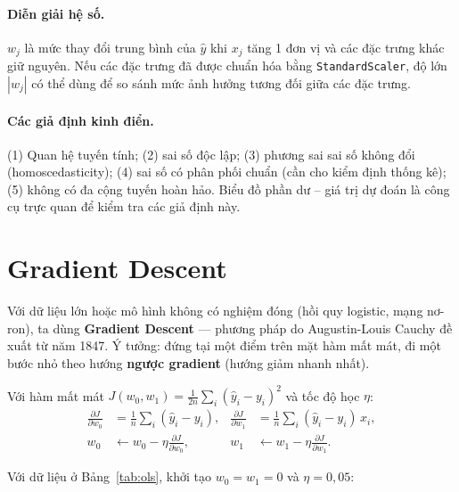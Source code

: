 \paragraph{Diễn giải hệ số.} $w_j$ là mức thay đổi trung bình của $\hat{y}$ khi $x_j$ tăng 1 đơn vị và các đặc trưng khác giữ nguyên. Nếu các đặc trưng đã được chuẩn hóa bằng \texttt{StandardScaler}, độ lớn $|w_j|$ có thể dùng để so sánh mức ảnh hưởng tương đối giữa các đặc trưng.

\paragraph{Các giả định kinh điển.} (1) Quan hệ tuyến tính; (2) sai số độc lập; (3) phương sai sai số không đổi (homoscedasticity); (4) sai số có phân phối chuẩn (cần cho kiểm định thống kê); (5) không có đa cộng tuyến hoàn hảo. Biểu đồ phần dư -- giá trị dự đoán là công cụ trực quan để kiểm tra các giả định này.

\section{Gradient Descent}

Với dữ liệu lớn hoặc mô hình không có nghiệm đóng (hồi quy logistic, mạng nơ-ron), ta dùng \textbf{Gradient Descent} --- phương pháp do Augustin-Louis Cauchy đề xuất từ năm 1847. Ý tưởng: đứng tại một điểm trên mặt hàm mất mát, đi một bước nhỏ theo hướng \textbf{ngược gradient} (hướng giảm nhanh nhất).

Với hàm mất mát $J(w_0, w_1) = \frac{1}{2n}\sum_i (\hat{y}_i - y_i)^2$ và tốc độ học $\eta$:
\begin{align}
    \frac{\partial J}{\partial w_0} &= \frac{1}{n}\sum_i (\hat{y}_i - y_i), &
    \frac{\partial J}{\partial w_1} &= \frac{1}{n}\sum_i (\hat{y}_i - y_i)\, x_i, \\
    w_0 &\leftarrow w_0 - \eta \frac{\partial J}{\partial w_0}, &
    w_1 &\leftarrow w_1 - \eta \frac{\partial J}{\partial w_1}.
\end{align}

\begin{example}
Với dữ liệu ở Bảng~\ref{tab:ols}, khởi tạo $w_0 = w_1 = 0$ và $\eta = 0{,}05$:
\end{example}

